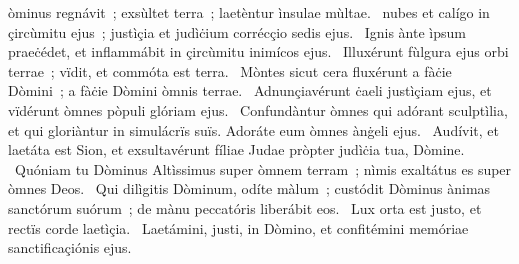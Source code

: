 { }
{%
òminus regnávit~; exsùltet terra~; laetèntur ìnsulae mùltae. 
~nubes et calígo in çircùmitu ejus~; justìçia et judìċium corrécçio sedis ejus. 
~Ignis ànte ìpsum praeċédet, et inflammábit in çircùmitu inimícos ejus. 
~Illuxérunt fùlgura ejus orbi terrae~; vïdit, et commóta est terra. 
~Mòntes sicut cera fluxérunt a fàċie Dòmini~; a fàċie Dòmini òmnis terrae. 
~Adnunçiavérunt ċaeli justìçiam ejus, et vïdérunt òmnes pòpuli glóriam ejus. 
~Confundàntur òmnes qui adórant sculptìlia, et qui gloriàntur in simulácrïs suïs. Adoráte eum òmnes ànġeli ejus. 
~Audívit, et laetáta est Sion, et exsultavérunt fíliae Judae pròpter judìċia tua, Dòmine. 
~Quóniam tu Dòminus Altìssimus super òmnem terram~; nìmis exaltátus es super òmnes Deos. 
~Qui dilìgitis Dòminum, odíte màlum~; custódit Dòminus ànimas sanctórum suórum~; de mànu peccatóris liberábit eos. 
~Lux orta est justo, et rectïs corde laetìçia. 
~Laetámini, justi, in Dòmino, et confitémini memóriae sanctificaçiónis ejus. 
}
